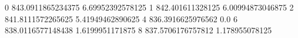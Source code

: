 0 843.0911865234375 6.69952392578125
1 842.401611328125 6.00994873046875
2 841.8111572265625 5.41949462890625
4 836.3916625976562 0.0
6 838.0116577148438 1.6199951171875
8 837.5706176757812 1.178955078125
